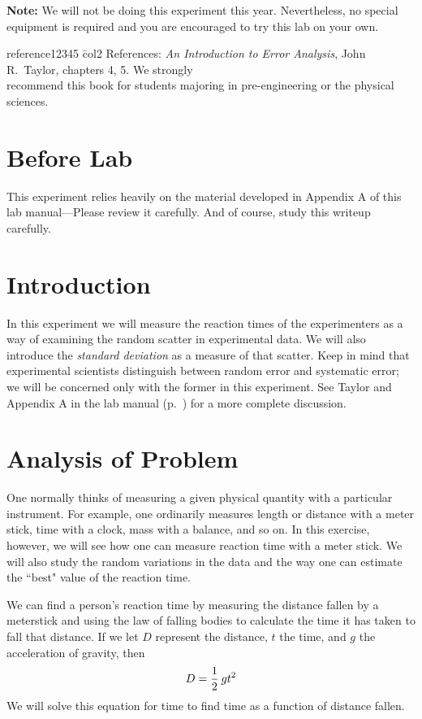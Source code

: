 \newexp
{\bf Note:} We will not be doing this experiment this year.
Nevertheless, no special equipment is required and you are encouraged
to try this lab on your own.

\begin{tabbing}
reference12345 \= col2 \kill
References: \> {\em An Introduction to Error Analysis}, John R.\ Taylor,
   chapters 4, 5.  We strongly \\
\> recommend this book for students majoring in pre-engineering or
the physical \\
\> sciences. \\
\end{tabbing}

\section*{Before Lab}
This experiment relies heavily on the material developed in Appendix A
of this lab manual---Please review it carefully.  And of course, study
this writeup carefully.

\section*{Introduction}
     In this experiment we will measure the reaction times of the
experimenters as a way of examining the random scatter in
experimental data.  We will also introduce the {\em standard deviation}
 as a measure of
that scatter.  Keep in mind that experimental scientists
distinguish between random error and systematic error; we will be
concerned only with the former in this experiment.  See Taylor
and Appendix A in the lab manual (p.~\pageref{scierror})
for a more complete discussion.

\section*{Analysis of Problem}
      One normally thinks of measuring a given physical
quantity with a particular instrument.  For example, one
ordinarily measures length or distance with a meter stick, time
with a clock, mass with a balance, and so on.  In this exercise,
however, we will see how one can measure reaction time with a
meter stick.  We will also study the random variations in the
data and the way one can estimate the ``best" value of the
reaction time.

We can find a person's reaction time by measuring the distance fallen
by a meterstick and using the law of falling bodies to calculate the
time it has taken to fall that distance.  If we let $D$ represent the
distance, $t$ the time, and $g$ the acceleration of gravity, then
\begin{equation}
D = {{1} \over {2}} \: g t^{2}  \label{eq:react1}
\end{equation}
We will solve this equation for time to find time as a function
of distance fallen.

